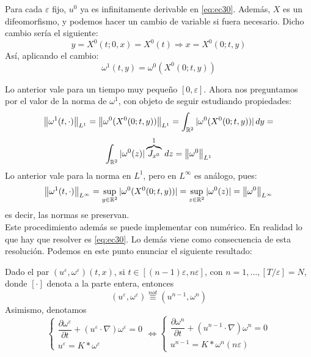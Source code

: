 \begin{observacion}
    Para cada $\varepsilon$ fijo, $u^0$ ya es infinitamente derivable en \eqref{eq:ec30}. Además, $X$ es un difeomorfismo, y podemos hacer un 
    cambio de variable si fuera necesario. Dicho cambio sería el siguiente:
    $$y = X^0(t; 0, x) = X^0(t) \Longrightarrow x = X^0(0; t,y)$$
    Así, aplicando el cambio:
    $$\omega^1(t,y) = \omega^0(X^0(0;t,y))$$
\end{observacion}

Lo anterior vale para un tiempo muy pequeño $[0, \varepsilon]$. Ahora nos preguntamos por el valor de la norma de $\omega^1$, 
con objeto de seguir estudiando propiedades:
$$\left\lVert \omega^1(t, \cdot) \right\rVert_{L^1} = \left\lVert \omega^0(X^0(0; t, y)) \right\rVert_{L^1} = \int_{\mathbb{R}^2} |\omega^0(X^0(0;t,y))|\,dy = $$
$$\int_{\mathbb{R}^2} |\omega^0(z)| \overbrace{J_{x^0}}^{1}\,dz = \left\lVert \omega^0 \right\rVert_{L^1}$$
Lo anterior vale para la norma en $L^1$, pero en $L^\infty$ es análogo, pues:
$$\left\lVert \omega^1(t, \cdot) \right\rVert_{L^\infty} = \sup_{y \in \mathbb{R}^2} |\omega^0(X^0(0;t,y))| = \sup_{z \in \mathbb{R}^2} |\omega^0(z)| = \left\lVert \omega^0 \right\rVert_{L^\infty}$$
es decir, las normas se preservan. \\

Este procedimiento además se puede implementar con numérico. En realidad lo que hay que resolver es \eqref{eq:ec30}. Lo demás viene como 
consecuencia de esta resolución. Podemos en este punto enunciar el siguiente resultado:

\begin{notacion}
    Dado el par $(u^\varepsilon, \omega^\varepsilon)(t,x)$, si $t \in [(n-1)\varepsilon, n \varepsilon]$, con $n = 1, \ldots, [T/\varepsilon] = N$,
    donde $[\cdot]$ denota a la parte entera, entonces 
    $$(u^\varepsilon, \omega^\varepsilon) \stackrel{not}{\equiv} (u^{n-1}, \omega^n)$$
    Asimismo, denotamos 
    \begin{equation*}
        \begin{cases}
            \dfrac{\partial \omega^\varepsilon}{\partial t} + (u^\varepsilon \cdot \nabla) \omega^\varepsilon = 0 \\ 
            u^\varepsilon = K \ast \omega^\varepsilon
        \end{cases}
        \iff 
        \begin{cases}
            \dfrac{\partial \omega^n}{\partial t} + (u^{n-1} \cdot \nabla) \omega^n = 0 \\ 
            u^{n-1} = K \ast \omega^{n}(n\varepsilon)
        \end{cases}
    \end{equation*}
\end{notacion}

